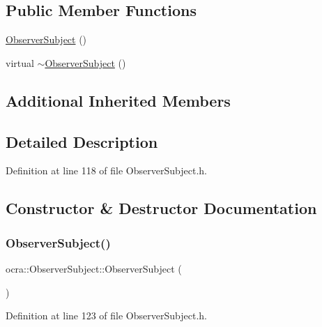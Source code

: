\subsection*{Public Member Functions}
\begin{DoxyCompactItemize}
\item 
\hyperlink{classocra_1_1ObserverSubject_ac2fe2208f340a71da5821952c26460ec}{Observer\+Subject} ()
\item 
virtual \hyperlink{classocra_1_1ObserverSubject_a1017c89ce175d262f42324cb76ed5f3b}{$\sim$\+Observer\+Subject} ()
\end{DoxyCompactItemize}
\subsection*{Additional Inherited Members}


\subsection{Detailed Description}


Definition at line 118 of file Observer\+Subject.\+h.



\subsection{Constructor \& Destructor Documentation}
\hypertarget{classocra_1_1ObserverSubject_ac2fe2208f340a71da5821952c26460ec}{}\label{classocra_1_1ObserverSubject_ac2fe2208f340a71da5821952c26460ec} 
\subsubsection{\texorpdfstring{Observer\+Subject()}{ObserverSubject()}}
{\footnotesize\ttfamily ocra\+::\+Observer\+Subject\+::\+Observer\+Subject (\begin{DoxyParamCaption}{ }\end{DoxyParamCaption})\hspace{0.3cm}{\ttfamily [inline]}}



Definition at line 123 of file Observer\+Subject.\+h.

\hypertarget{classocra_1_1ObserverSubject_a1017c89ce175d262f42324cb76ed5f3b}{}\label{classocra_1_1ObserverSubject_a1017c89ce175d262f42324cb76ed5f3b} 
